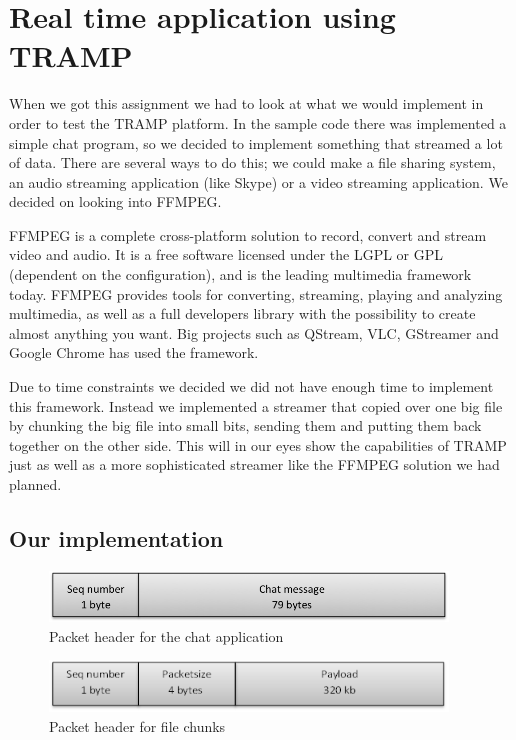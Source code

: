 
\section{Real time application using TRAMP}
\label{sec:streamer}
When we got this assignment we had to look at what we would implement in order to test the TRAMP platform. In the sample code there was implemented a simple chat program, so we decided to implement something that streamed a lot of data. There are several ways to do this; we could make a file sharing system, an audio streaming application (like Skype) or a video streaming application. We decided on looking into FFMPEG.

FFMPEG is a complete cross-platform solution to record, convert and stream video and audio. It is a free software licensed under the LGPL or GPL (dependent on the configuration), and is the leading multimedia framework today.\cite{FFMPEG-homepage}
FFMPEG provides tools for converting, streaming, playing and analyzing multimedia, as well as a full developers library with the possibility to create almost anything you want. Big projects such as QStream, VLC, GStreamer and Google Chrome has used the framework.

Due to time constraints we decided we did not have enough time to implement this framework. Instead we implemented a streamer that copied over one big file by chunking the big file into small bits, sending them and putting them back together on the other side. This will in our eyes show the capabilities of TRAMP just as well as a more sophisticated streamer like the FFMPEG solution we had planned.

\subsection{Our implementation}
\begin{figure}[ht!]
\centering
 \includegraphics[width=300pt]{sendchatpkt.png}
\caption{Packet header for the chat application}
\label{Figure:Packet_header_chat}
\end{figure}


\begin{figure}[ht!]
\centering
 \includegraphics[width=300pt]{sendpkt.png}
\caption{Packet header for file chunks}
\label{Figure:pkt_header_file}
\end{figure}

